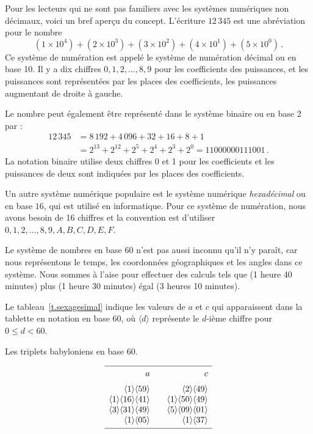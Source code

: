 Pour les lecteurs qui ne sont pas familiers avec les systèmes numériques non décimaux, voici un bref aperçu du concept. L'écriture $12\,345$ est une abréviation pour le nombre 
\[
(1\times 10^4) + (2\times 10^3) + (3\times 10^2) + (4\times 10^1) + (5\times 10^0)\,.
\]
Ce système de numération est appelé le système de numération décimal ou en base 10. Il y a dix chiffres $0,1,2,\ldots,8,9$ pour les coefficients des puissances, et les puissances sont représentées par les places des coefficients, les puissances augmentant de droite à gauche. 

Le nombre peut également être représenté dans le système binaire ou en base 2 par :
\begin{align*}
12\,345&=8\,192 + 4\,096 + 32+16+8+1\\
&=
2^{13} + 2^{12} + 2^{5} + 2^{4} + 2^{3} + 2^0=11000000111001\,.
\end{align*}
La notation binaire utilise deux chiffres 0 et 1 pour les coefficients et les puissances de deux sont indiquées par les places des coefficients.

Un autre système numérique populaire est le système numérique \emph{hexadécimal} ou en base $16$, qui est utilisé en informatique. Pour ce système de numération, nous avons besoin de 16 chiffres et la convention est d'utiliser $0,1,2,\ldots,8,9,A,B,C,D,E,F$.

Le système de nombres en base 60 n'est pas aussi inconnu qu'il n'y paraît, car nous représentons le temps, les coordonnées géographiques et les angles dans ce système. Nous sommes à l'aise pour effectuer des calculs tels que (1 heure 40 minutes) plus (1 heure 30 minutes) égal (3 heures 10 minutes).

Le tableau~\ref{t.sexagesimal} indique les valeurs de $a$ et $c$ qui apparaissent dans la tablette en notation en base 60, où $\langle d\rangle$ représente le $d$-ième chiffre pour $0\leq d<60$.
\begin{table}[htbp]
\caption{Les triplets babyloniens en base 60.}\label{t.sexagesimal}
\[
\begin{array}{r@{$\quad\quad$}r}
\hline
\noalign{\smallskip}
a&c\\
\noalign{\smallskip}\noalign{\smallskip}
\langle 1\rangle \langle 59 \rangle&\langle 2\rangle \langle 49 \rangle\\
\langle 1\rangle \langle 16 \rangle\langle 41\rangle&\langle 1\rangle \langle 50 \rangle\langle 49\rangle\\
\langle 3\rangle \langle 31 \rangle\langle 49\rangle&\langle 5\rangle \langle 09 \rangle\langle 01\rangle\\
\langle 1\rangle \langle 05 \rangle&\langle 1\rangle \langle 37 \rangle\\
\noalign{\smallskip}\hline
\end{array}
\]
\end{table}



